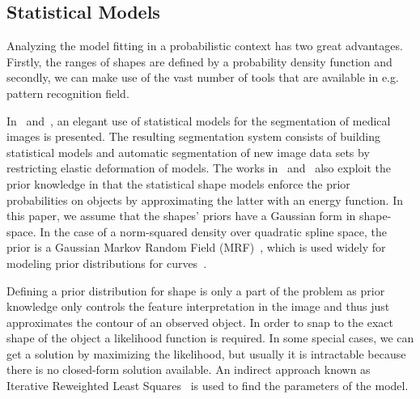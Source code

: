 \documentclass[conference]{IEEEtran}
\begin{document}
\subsection{Statistical Models}
\label{sec:sm}
Analyzing the model fitting in a probabilistic
context has two great advantages. Firstly, the ranges of shapes are defined by a
probability density function and secondly, we can make use of the vast number 
of tools that are available in e.g. pattern recognition field.

In~\cite{kelemen1999three} and~\cite{kelemen1999elastic}, an elegant
use of statistical models for the segmentation of medical images is
presented. The resulting segmentation system consists of building
statistical models and automatic segmentation of new image data
sets by restricting elastic deformation of models. The works
in~\cite{sclaroff2001deformable} and~\cite{liu1999deformable} also
exploit the prior knowledge in that the statistical shape models enforce the prior
probabilities on objects by approximating the latter with an energy function.  
In this paper, we assume that the shapes' priors have a Gaussian form in
shape-space. In the case of a norm-squared density over  quadratic spline space,
the prior is a Gaussian Markov Random Field (MRF)~\cite{blake1998active}, 
which is used widely  for modeling prior distributions for 
curves~\cite{storvik1994bayesian}.

Defining a prior distribution for shape is only a part of the
problem as prior knowledge only controls the feature interpretation in the
image and thus just approximates the contour of an observed object. In
order to snap to the exact shape of the object a likelihood function is required. In some
special cases, we can get a solution by maximizing the likelihood, but
usually it is intractable because there is no closed-form solution available. 
An indirect approach known as Iterative Reweighted Least Squares~\cite{bishop2006pattern} 
is used to find the parameters of the model.

\end{document}
